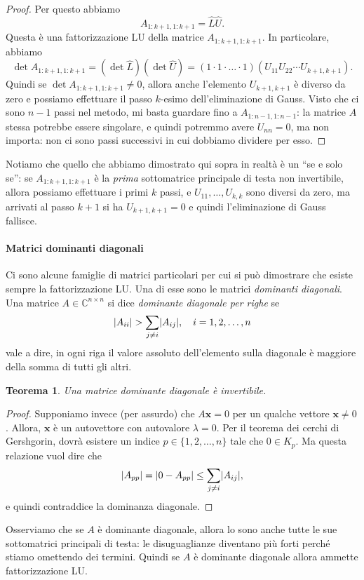 \documentclass[a4paper]{report}
\DeclarePairedDelimiter{\abs}{\lvert}{\rvert}
\newtheorem{theorem}{Teorema}[chapter]
\theoremstyle{definiton}
\theoremstyle{remark}
\begin{document}
\begin{proof}
Per questo abbiamo
\[
A_{1:k+1,1:k+1} = \hat{L}\hat{U}.
\]
Questa è una fattorizzazione LU della matrice $A_{1:k+1,1:k+1}$. In particolare, abbiamo
\[
\det A_{1:k+1,1:k+1} = (\det \hat{L}) (\det \hat{U}) = (1\cdot 1 \cdot \dots \cdot 1) (U_{11}U_{22}\cdots U_{k+1,k+1}).
\]
Quindi se $\det A_{1:k+1,1:k+1} \neq 0$, allora anche l'elemento $U_{k+1,k+1}$ è diverso da zero e possiamo effettuare il passo $k$-esimo dell'eliminazione di Gauss. Visto che ci sono $n-1$ passi nel metodo, mi basta guardare fino a $A_{1:n-1,1:n-1}$: la matrice $A$ stessa potrebbe essere singolare, e quindi potremmo avere $U_{nn}=0$, ma non importa: non ci sono passi successivi in cui dobbiamo dividere per esso.
\end{proof}
Notiamo che quello che abbiamo dimostrato qui sopra in realtà è un ``se e solo se'': se $A_{1:k+1,1:k+1}$ è la \emph{prima} sottomatrice principale di testa non invertibile, allora possiamo effettuare i primi $k$ passi, e $U_{11},\dots,U_{k,k}$ sono diversi da zero, ma arrivati al passo $k+1$ si ha $U_{k+1,k+1}=0$ e quindi l'eliminazione di Gauss fallisce.

\paragraph{Matrici dominanti diagonali}

Ci sono alcune famiglie di matrici particolari per cui si può dimostrare che esiste sempre la fattorizzazione LU. Una di esse sono le matrici \emph{dominanti diagonali}. Una matrice $A\in\mathbb{C}^{n\times n}$ si dice \emph{dominante diagonale per righe} se
\[
\abs{A_{ii}} > \sum_{j\neq i} \abs{A_{ij}}, \quad i=1,2,\dots,n
\]
vale a dire, in ogni riga il valore assoluto dell'elemento sulla diagonale è maggiore della somma di tutti gli altri.
\begin{theorem}
Una matrice dominante diagonale è invertibile.
\end{theorem}
\begin{proof}
Supponiamo invece (per assurdo) che $A\mathbf{x}=0$ per un qualche vettore $\mathbf{x}\neq 0$. Allora, $\mathbf{x}$ è un autovettore con autovalore $\lambda=0$. Per il teorema dei cerchi di Gershgorin, dovrà esistere un indice $p\in \{1,2,\dots,n\}$ tale che $0 \in K_p$. Ma questa relazione vuol dire che
\[
\abs{A_{pp}} = \abs{0 - A_{pp}} \leq \sum_{j\neq i} \abs{A_{ij}},
\]
e quindi contraddice la dominanza diagonale.
\end{proof}
Osserviamo che se $A$ è dominante diagonale, allora lo sono anche tutte le sue sottomatrici principali di testa: le disuguaglianze diventano più forti perché stiamo omettendo dei termini. Quindi se $A$ è dominante diagonale allora ammette fattorizzazione LU.
\end{document}
